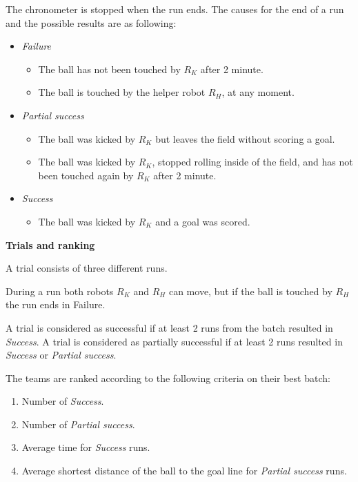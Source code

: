 The chronometer is stopped when the run ends. The causes for the end of a run and
the possible results are as following:
\begin{itemize}
\item \textit{Failure}
  \begin{itemize}
    \item The ball has not been touched by $R_K$ after 2 minute. 
     \item The ball is touched by the helper robot $R_H$, at any moment. 
  \end{itemize}
\item \textit{Partial success}
  \begin{itemize}
    \item The ball was kicked by $R_K$ but leaves the field without scoring a goal.
    \item The ball was kicked by $R_K$, stopped rolling inside of the field, and has not been touched again by $R_K$ after 2 minute.
  \end{itemize}
\item \textit{Success}
  \begin{itemize}
    \item The ball was kicked by $R_K$ and a goal was scored.
  \end{itemize}
\end{itemize}

{\bfseries Trials and ranking}

\smallskip

A trial consists of three different runs. 

During a run both robots $R_K$ and $R_H$ can move, but if the ball is touched by $R_H$ the run ends in Failure.

A trial is considered as successful if at least 2
runs from the batch resulted in \textit{Success}. A trial is considered as
partially successful if at least 2 runs resulted in \textit{Success} or \textit{Partial success}.

The teams are ranked according to the following criteria on their best batch:
\begin{enumerate}
\item Number of \textit{Success}.
\item Number of \textit{Partial success}.
\item Average time for \textit{Success} runs.
\item Average shortest distance of the ball to the goal line for \textit{Partial success} runs.
\end{enumerate}




